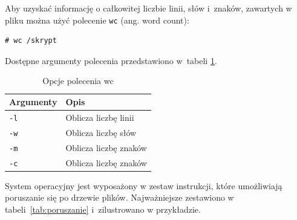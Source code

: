\begin{example}\label{ex:wys}

Aby uzyskać informację o całkowitej liczbie linii, słów i~znaków, zawartych w pliku można użyć polecenie \lstinline[style=MyBashStyle]{wc} (ang. word count):

\begin{lstlisting}[style=MyBashStyle]
# wc /skrypt
\end{lstlisting}

Dostępne argumenty polecenia przedstawiono w~tabeli \ref{tab:opcjeWC}.


\begin{table}[h!]
\centering
\caption{Opcje polecenia wc}
\setlength{\arrayrulewidth}{1pt}
\setlength{\tabcolsep}{6pt}
\renewcommand{\arraystretch}{1.2}
\begin{tabular}{ |p{}|p{}|}
\hline \rowcolor{gray}
\textbf{Argumenty} & \textbf{Opis} \\ \hline
\mbox{\lstinline[style=MyBashStyle]{-l}} & Oblicza liczbę linii \\ \hline
\mbox{\lstinline[style=MyBashStyle]{-w}} & Oblicza liczbę słów \\ \hline
\mbox{\lstinline[style=MyBashStyle]{-m}} & Oblicza liczbę znaków \\ \hline
\mbox{\lstinline[style=MyBashStyle]{-c}} & Oblicza liczbę znaków  \\ \hline
\end{tabular}
\label{tab:opcjeWC}
\end{table}

\begin{example}

System operacyjny jest wyposażony w zestaw instrukcji, które umożliwiają poruszanie się po drzewie plików. Najważniejsze zestawiono w tabeli~\ref{tab:poruszanie} i~zilustrowano w przykładzie.


\end{example}
\end{example}
